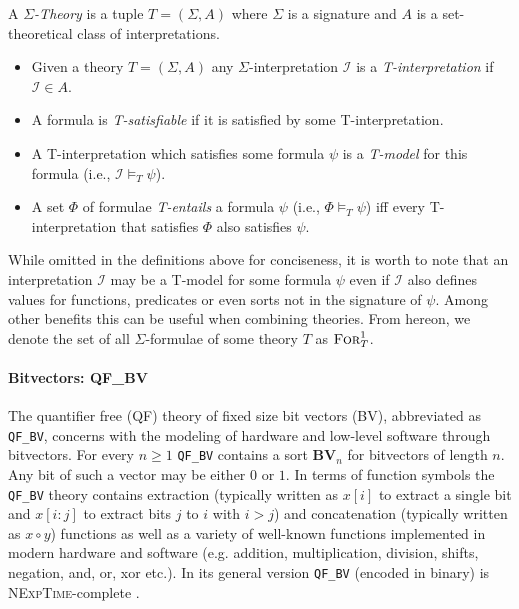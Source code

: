 \begin{definition}
A \textit{$\Sigma$-Theory} is a tuple $T=\left(\Sigma,A\right)$ where $\Sigma$ is a signature and $A$ is a set-theoretical class of interpretations.
\end{definition}
\begin{definition}
\begin{itemize}
    \item Given a theory $T=\left(\Sigma,A\right)$ any $\Sigma$-interpretation $\mathcal{I}$ is a \textit{T-interpretation} if $\mathcal{I}\in A$.
    \item A formula is \textit{T-satisfiable} if it is satisfied by some T-interpretation.
    \item A T-interpretation which satisfies some formula $\psi$ is a \textit{T-model} for this formula (i.e., $\mathcal{I}\vDash_T\psi$).
    \item A set $\Phi$ of formulae \textit{T-entails} a formula $\psi$ (i.e., $\Phi\vDash_T\psi$) iff every T-interpretation that satisfies $\Phi$ also satisfies $\psi$.
\end{itemize}
\end{definition}
While omitted in the definitions above for conciseness, it is worth to note that an interpretation $\mathcal{I}$ may be a T-model for some formula $\psi$ even if $\mathcal{I}$ also defines values for functions, predicates or even sorts not in the signature of $\psi$. Among other benefits this can be useful when combining theories.
From hereon, we denote the set of all $\Sigma$-formulae of some theory $T$ as $\textsc{For}^1_T$.

\paragraph{Bitvectors: QF\_BV}
The quantifier free (QF) theory of fixed size bit vectors (BV), abbreviated as \texttt{QF\_BV}, concerns with the modeling of hardware and low-level software through bitvectors. 
For every $n\geq1$ \texttt{QF\_BV} contains a sort $\mathbf{BV}_n$ for bitvectors of length $n$. Any bit of such a vector may be either $0$ or $1$.
In terms of function symbols the \texttt{QF\_BV} theory contains extraction (typically written as $x[i]$ to extract a single bit and $x[i\colon j]$ to extract bits $j$ to $i$ with $i>j$) and concatenation (typically written as $x\circ y$) functions as well as a variety of well-known functions implemented in modern hardware and software (e.g. addition, multiplication, division, shifts, negation, and, or, xor etc.). In its general version \texttt{QF\_BV} (encoded in binary) is \textsc{NExpTime}-complete \cite{KovasznaiFroehlichBiere-SMT12}.

